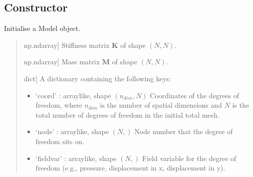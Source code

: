 \documentclass[letterpaper,10pt,english]{sphinxmanual}
\begin{document}
\subsection{Constructor}
\label{\detokenize{model:constructor}}

\begin{fulllineitems}
\label{\detokenize{model:pywfe.model.Model.__init__}}
\pysigstartsignatures
{}
\pysigstopsignatures
\sphinxAtStartPar
Initialise a Model object.
\begin{quote}\begin{description}
\begin{description}
\sphinxlineitem{\sphinxstylestrong{K}}{[}np.ndarray{]}
\sphinxAtStartPar
Stiffness matrix \(\mathbf{K}\) of shape \((N, N)\).

\sphinxlineitem{\sphinxstylestrong{M}}{[}np.ndarray{]}
\sphinxAtStartPar
Mass matrix \(\mathbf{M}\) of shape \((N, N)\).

\sphinxlineitem{\sphinxstylestrong{dof}}{[}dict{]}
\sphinxAtStartPar
A dictionary containing the following keys:
\begin{itemize}
\item {} 
\sphinxAtStartPar
‘coord’ : array\sphinxhyphen{}like, shape \((n_{dim}, N)\)
Coordinates of the degrees of freedom, where \(n_{dim}\) is the number of spatial dimensions and \(N\) is the total number of degrees of freedom in the initial total mesh.

\item {} 
\sphinxAtStartPar
‘node’ : array\sphinxhyphen{}like, shape \((N,)\)
Node number that the degree of freedom sits on.

\item {} 
\sphinxAtStartPar
‘fieldvar’ : array\sphinxhyphen{}like, shape \((N,)\)
Field variable for the degree of freedom (e.g., pressure, displacement in x, displacement in y).


\end{itemize}
\end{description}
\end{description}
\end{quote}
\end{fulllineitems}
\end{document}
